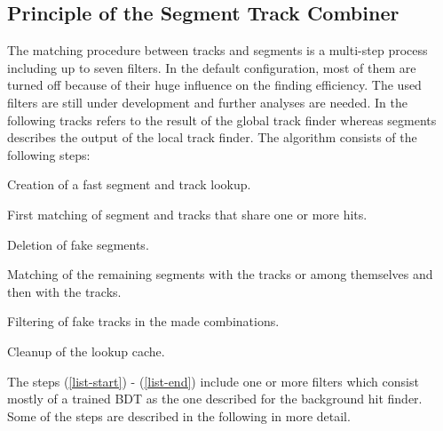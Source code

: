\subsection{Principle of the Segment Track Combiner}

The matching procedure between tracks and segments is a multi-step process including up to seven filters. In the default configuration, most of them are turned off because of their huge influence on the finding efficiency. The used filters are still under development and further analyses are needed. In the following tracks refers to the result of the global track finder whereas segments describes the output of the local track finder. The algorithm consists of the following steps:
\begin{zlist}
 \item Creation of a fast segment and track lookup.
 \item First matching of segment and tracks that share one or more hits. \label{list-start}
 \item Deletion of fake segments. \label{list-fakes}
 \item Matching of the remaining segments with the tracks or among themselves and then with the tracks. \label{list-second}
 \item Filtering of fake tracks in the made combinations.  \label{list-end}
 \item Cleanup of the lookup cache.
\end{zlist}

The steps (\ref{list-start}) - (\ref{list-end}) include one or more filters which consist mostly of a trained BDT as the one described for the background hit finder. Some of the steps are described in the following in more detail.

